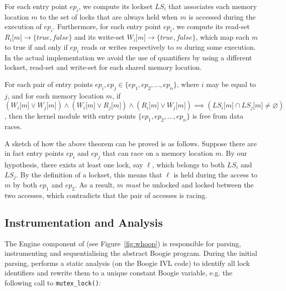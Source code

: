 For each entry point $\mathit{ep}_{i}$, we compute its lockset $\mathit{LS}_{i}$ that associates each memory location $m$ to the set of locks that are always held when $m$ is accessed during the execution of $\mathit{ep}_{i}$. Furthermore, for each entry point $\mathit{ep}_{i}$, we compute its read-set $R_{i}\lbrack m\rbrack \rightarrow \{true, false\}$ and its write-set $W_{i}\lbrack m\rbrack \rightarrow \{true, false\}$, which map each $m$ to true if and only if $\mathit{ep}_{i}$ reads or writes respectively to $m$ during some execution. In the actual implementation we avoid the use of quantifiers by using a different lockset, read-set and write-set for each shared memory location.

\begin{theorem}
\label{theorem:locksets}
For each pair of entry points $\mathit{ep}_{i}, \mathit{ep}_{j}\in \{\mathit{ep}_{1}, \mathit{ep}_{2}, ..., \mathit{ep}_{n}\}$, where $i$ may be equal to $j$, and for each memory location $m$, if $(W_{i}\lbrack m\rbrack \vee W_{j}\lbrack m\rbrack) \wedge (W_{i}\lbrack m\rbrack \vee R_{j}\lbrack m\rbrack) \wedge (R_{i}\lbrack m\rbrack \vee W_{j}\lbrack m\rbrack) \implies (\mathit{LS}_{i}\lbrack m\rbrack \cap \mathit{LS}_{j}\lbrack m\rbrack \not= \varnothing)$, then the kernel module with entry points $\{\mathit{ep}_{1}, \mathit{ep}_{2}, \dotsc, \mathit{ep}_{n}\}$ is free from data races.
\end{theorem}

A sketch of how the above theorem can be proved is as follows. Suppose there are in fact entry points $\mathit{ep}_{i}$ and $\mathit{ep}_{j}$ that can race on a memory location $m$. By our hypothesis, there exists at least one lock, say $\ell$, which belongs to both $\mathit{LS}_{i}$ and $\mathit{LS}_{j}$. By the definition of a lockset, this means that $\ell$ is held during the access to $m$ by both $ep_1$ and $ep_2$. As a result, $m$ \emph{must} be unlocked and locked between the two accesses, which contradicts that the pair of accesses is racing.

\subsection{Instrumentation and Analysis}
\label{tech:method}

The Engine component of \whoop (see Figure~\ref{fig:whoop}) is responsible for parsing, instrumenting and sequentialising the abstract Boogie program. During the initial parsing, \whoop performs a static analysis (on the Boogie IVL code) to identify all lock identifiers and rewrite them to a unique constant Boogie variable, e.g. the following call to \texttt{mutex\_lock()}:

